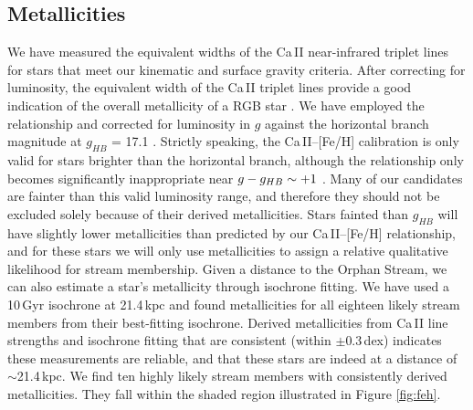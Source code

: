 \documentclass[10pt,apjl]{emulateapj}
\begin{document}
\subsection{Metallicities}
\label{sec:metallicities}

We have measured the equivalent widths of the Ca\,\textsc{II} near-infrared triplet lines for stars that meet our kinematic and surface gravity criteria. After correcting for luminosity, the equivalent width of the Ca\,\textsc{II} triplet lines provide a good indication of the overall metallicity of a RGB star \citep{Amandroff_Da_Costa_1991}. We have employed the \citet{Starkenburg_et-al_2010} relationship and corrected for luminosity in $g$ against the horizontal branch magnitude at $g_{HB}$ = 17.1 \citep{Newberg_et-al_2010}. Strictly speaking, the Ca\,\textsc{II}\---[Fe/H] calibration is only valid for stars brighter than the horizontal branch, although the relationship only becomes significantly inappropriate near $g \-- g_{HB} \sim +1$ \citep{Saviane_et-al_2012}. Many of our candidates are fainter than this valid luminosity range, and therefore they should not be excluded solely because of their derived metallicities. Stars fainted than $g_{HB}$ will have slightly lower metallicities than predicted by our Ca\,\textsc{II}\---[Fe/H] relationship, and for these stars we will only use metallicities to assign a relative qualitative likelihood for stream membership.
Given a distance to the Orphan Stream, we can also estimate a star's metallicity through isochrone fitting. We have used a 10\,Gyr \citet{Girardi_et-al_2008} isochrone at 21.4\,kpc \citep{Newberg_et-al_2010} and found metallicities for all eighteen likely stream members from their best-fitting isochrone. Derived metallicities from Ca\,\textsc{II} line strengths and isochrone fitting that are consistent (within $\pm0.3$\,dex) indicates these measurements are reliable, and that these stars are indeed at a distance of $\sim$21.4\,kpc. We find ten highly likely stream members with consistently derived metallicities. They fall within the shaded region illustrated in Figure \ref{fig:feh}. 
\end{document}
